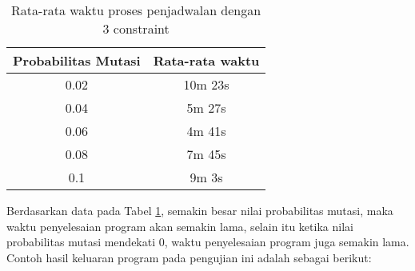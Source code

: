 \begin{longtable}[c]{|c|c|}
  \caption{Rata-rata waktu proses penjadwalan dengan 3 constraint}
  \label{tab:3 constraint}\\
  \hline
  \rowcolor[HTML]{C0C0C0} 
  Probabilitas Mutasi & Rata-rata waktu \\ \hline
  0.02                & 10m 23s         \\ \hline
  0.04                & 5m 27s          \\ \hline
  0.06                & 4m 41s          \\ \hline
  0.08                & 7m 45s          \\ \hline
  0.1                 & 9m 3s           \\ \hline
\end{longtable}
Berdasarkan data pada Tabel \ref{tab:3 constraint}, semakin besar nilai probabilitas mutasi, maka waktu penyelesaian program akan semakin lama, selain itu ketika nilai probabilitas mutasi mendekati 0, waktu penyelesaian program juga semakin lama.
Contoh hasil keluaran program pada pengujian ini adalah sebagai berikut:
